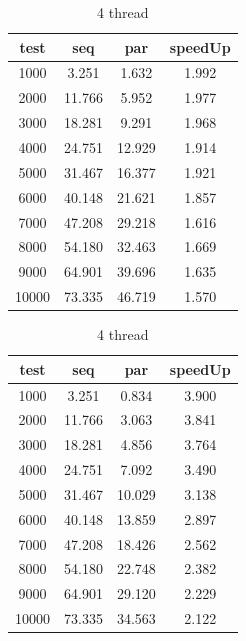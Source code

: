 \documentclass[11pt]{article}
\begin{document}
    \begin{table}
        \begin{minipage}{0.49\textwidth}
            \begin{tabular}{|c|c|c|c|}
            \hline
            test & seq & par & speedUp \\
            \hline
            1000 & 3.251 & 1.632 & 1.992 \\
            2000 & 11.766 & 5.952 & 1.977 \\
            3000 & 18.281 & 9.291 & 1.968 \\
            4000 & 24.751 & 12.929 & 1.914 \\
            5000 & 31.467 & 16.377 & 1.921 \\
            6000 & 40.148 & 21.621 & 1.857 \\
            7000 & 47.208 & 29.218 & 1.616 \\
            8000 & 54.180 & 32.463 & 1.669 \\
            9000 & 64.901 & 39.696 & 1.635 \\
            10000 & 73.335 & 46.719 & 1.570 \\
            \hline
            \end{tabular}
            \caption{2 thread}
        \end{minipage}
        \hfill
        \begin{minipage}{0.49\textwidth}
            \begin{tabular}{|c|c|c|c|}
                \hline
                test & seq & par & speedUp \\
                \hline
                1000 & 3.251 & 0.834 & 3.900 \\
                2000 & 11.766 & 3.063 & 3.841 \\
                3000 & 18.281 & 4.856 & 3.764 \\
                4000 & 24.751 & 7.092 & 3.490 \\
                5000 & 31.467 & 10.029 & 3.138 \\
                6000 & 40.148 & 13.859 & 2.897 \\
                7000 & 47.208 & 18.426 & 2.562 \\
                8000 & 54.180 & 22.748 & 2.382 \\
                9000 & 64.901 & 29.120 & 2.229 \\
                10000 & 73.335 & 34.563 & 2.122 \\
                \hline
            \end{tabular}
            \caption{4 thread}
        \end{minipage}
    \end{table}
\end{document}
